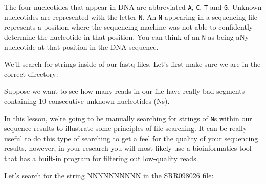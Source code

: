 \documentclass[
  letterpaper,
  DIV=11,
  numbers=noendperiod]{scrreprt}
\newenvironment{Shaded}{\begin{snugshade}}{\end{snugshade}}
\newcommand{\ExtensionTok}[1]{\textcolor[rgb]{0.00,0.23,0.31}{#1}}
\newcommand{\NormalTok}[1]{\textcolor[rgb]{0.00,0.23,0.31}{#1}}
\begin{document}
\begin{tcolorbox}[enhanced jigsaw, opacitybacktitle=0.6, colback=white, coltitle=black, opacityback=0, rightrule=.15mm, toptitle=1mm, toprule=.15mm, bottomtitle=1mm, colframe=quarto-callout-note-color-frame, arc=.35mm, titlerule=0mm, colbacktitle=quarto-callout-note-color!10!white, leftrule=.75mm, title=\textcolor{quarto-callout-note-color}{\faInfo}\hspace{0.5em}{Nucleotide abbreviations}, breakable, bottomrule=.15mm, left=2mm]

The four nucleotides that appear in DNA are abbreviated \texttt{A},
\texttt{C}, \texttt{T} and \texttt{G}. Unknown nucleotides are
represented with the letter \texttt{N}. An \texttt{N} appearing in a
sequencing file represents a position where the sequencing machine was
not able to confidently determine the nucleotide in that position. You
can think of an \texttt{N} as being aNy nucleotide at that position in
the DNA sequence.

\end{tcolorbox}

We'll search for strings inside of our fastq files. Let's first make
sure we are in the correct directory:

\begin{Shaded}
\end{Shaded}

Suppose we want to see how many reads in our file have really bad
segments containing 10 consecutive unknown nucleotides (Ns).

In this lesson, we're going to be manually searching for strings of
\texttt{N}s within our sequence results to illustrate some principles of
file searching. It can be really useful to do this type of searching to
get a feel for the quality of your sequencing results, however, in your
research you will most likely use a bioinformatics tool that has a
built-in program for filtering out low-quality reads.

Let's search for the string NNNNNNNNNN in the SRR098026 file:

\begin{Shaded}
\end{Shaded}
\end{document}
